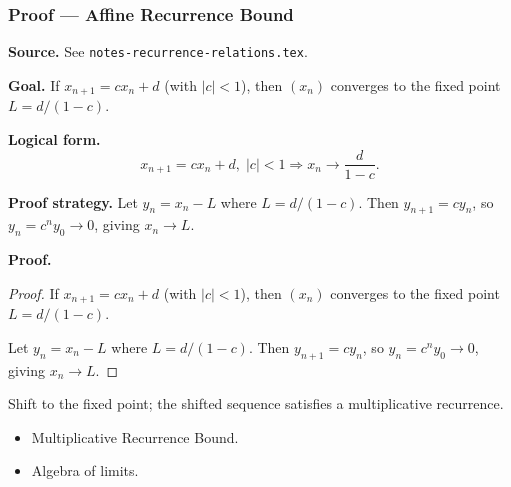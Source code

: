
\clearpage
{}
\hypertarget{proof-RA-ABB-P-affine-recurrence}{}

\subsubsection[Affine Recurrence Bound]{Proof --- Affine Recurrence Bound}

\bigskip

\noindent
\textbf{Source.} See \texttt{notes-recurrence-relations.tex}.

\vspace{0.75em}

\noindent
\textbf{Goal.} If $x_{n+1} = c x_n + d$ (with $|c| < 1$), then $(x_n)$ converges to the fixed point $L = d/(1-c)$.

\vspace{0.75em}

\noindent
\textbf{Logical form.}
\[
  x_{n+1} = c x_n + d,\; |c| < 1 \Rightarrow x_n \to \frac{d}{1-c}.
\]

\vspace{0.75em}

\noindent
\textbf{Proof strategy.} Let $y_n = x_n - L$ where $L = d/(1-c)$. Then $y_{n+1} = c y_n$, so $y_n = c^n y_0 \to 0$, giving $x_n \to L$.

\vspace{0.75em}

\noindent
\textbf{Proof.}
\begin{proof}
\Claim If $x_{n+1} = c x_n + d$ (with $|c| < 1$), then $(x_n)$ converges to the fixed point $L = d/(1-c)$.

\Given 

\Goal 

\Strategy Let $y_n = x_n - L$ where $L = d/(1-c)$. Then $y_{n+1} = c y_n$, so $y_n = c^n y_0 \to 0$, giving $x_n \to L$.

\medskip


\end{proof}

\begin{remark*}
Shift to the fixed point; the shifted sequence satisfies a multiplicative recurrence.
\end{remark*}

\begin{remark*}[Dependencies]
\begin{itemize}
  \item Multiplicative Recurrence Bound.
  \item Algebra of limits.
\end{itemize}
\end{remark*}

